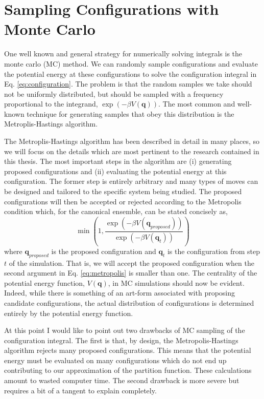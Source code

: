 \documentclass[11pt, proquest]{uwthesis}[2020/02/24]
\begin{document}
\section{Sampling Configurations with Monte Carlo}

One well known and general strategy for numerically solving integrals is the monte carlo (MC) method. We can randomly sample configurations and evaluate the potential energy at these configurations to solve the configuration integral in Eq. \ref{eq:configuration}. The problem is that the random samples we take should not be uniformly distributed, but should be sampled with a frequency proportional to the integrand, $\exp(-\beta V(\mathbf{q}))$. The most common and well-known technique for generating samples that obey this distribution is the Metroplis-Hastings algorithm.\autocite{metropolis_monte_1949}

\par The Metroplis-Hastings algorithm has been described in detail in many places, so we will focus on the details which are most pertinent to the research contained in this thesis.\autocite{chib_understanding_1995} The most important steps in the algorithm are (i) generating proposed configurations and (ii) evaluating the potential energy at this configuration. The former step is entirely arbitrary and many types of moves can be designed and tailored to the specific system being studied. The proposed configurations will then be accepted or rejected according to the Metropolis condition which, for the canonical ensemble, can be stated concisely as,
\begin{equation}
    \min\left(1,\frac{\exp(-\beta V(\mathbf{q}_{proposed}))}{\exp(-\beta V(\mathbf{q}_t))}\right)
    \label{eq:metropolis}
\end{equation}
where $\mathbf{q}_{proposed}$ is the proposed configuration and $\mathbf{q}_{t}$ is the configuration from step $t$ of the simulation. That is, we will accept the proposed configuration when the second argument in Eq. \ref{eq:metropolis} is smaller than one. The centrality of the potential energy function, $V(\mathbf{q})$, in MC simulations should now be evident. Indeed, while there is something of an art-form associated with proposing candidate configurations, the actual distribution of configurations is determined entirely by the potential energy function.

\par At this point I would like to point out two drawbacks of MC sampling of the configuration integral. The first is that, by design, the Metropolis-Hastings algorithm rejects many proposed configurations. This means that the potential energy must be evaluated on many configurations which do not end up contributing to our approximation of the partition function. These calculations amount to wasted computer time. The second drawback is more severe but requires a bit of a tangent to explain completely.
\end{document}
